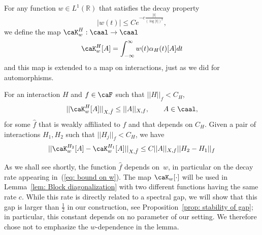 For any function $w\in L^1(\mathbb{R})$ that satisfies the decay property
\begin{equation} \label{eq: bound on w}
	|w(t)|  \leq C e^{-c\frac{|t|}{(\log|t|)^2}},
\end{equation}
we define the map $\caK^H_w: \caal\to\caal$
\begin{equation*}
	\caK^{H}_w[A] = \int_{-\infty}^\infty  w(t)\alpha_H(t)[A]dt
\end{equation*}
and this map is extended to a map on interactions, just as we did for automorphisms. 
\begin{lemma}  \label{lem: locality of cak}
	For an interaction $H$ and $f\in\caF$ such that $||H||_f <C_H$, 
	$$
	||\caK^{H}_w[A]||_{X,\hat{f}} \leq ||A||_{X,f}, \qquad A\in \caal,
	$$
	for some $\hat{f}$ that is weakly affiliated to $f$ and that depends on $C_H$.
	Given a pair of interactions $H_1,H_2$ such that $||H_j||_f <C_H$, we have 
	$$
	|| \caK^{H_2}_w[A] - \caK^{H_1}_w[A] ||_{X,\hat{f}} \leq C ||A||_{X,f}  ||H_2-H_1||_f
	$$
\end{lemma}
As we shall see shortly, the function $\hat f$ depends on~$w$, in particular on the decay rate appearing in~(\ref{eq: bound on w}). The map $\caK_w[\cdot]$ will be used in Lemma~\ref{lem: Block diagonalization} with two different functions having the same rate $c$. While this rate is directly related to a spectral gap, we will show that this gap is larger than $\frac{1}{2}$ in our construction, see Proposition~\ref{prop: stability of gap}; in particular, this constant depends on no parameter of our setting. We therefore chose not to emphasize the $w$-dependence in the lemma. 
